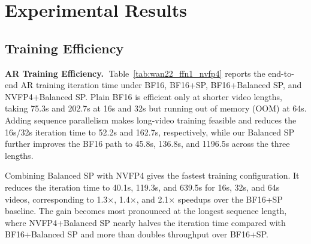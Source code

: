 \section{Experimental Results}
\subsection{Training Efficiency}
\textbf{AR Training Efficiency.}$\;$
Table~\ref{tab:wan22_ffn1_nvfp4} reports the end-to-end AR training iteration time under BF16, BF16+SP, BF16+Balanced SP, and NVFP4+Balanced SP. Plain BF16 is efficient only at shorter video lengths, taking 75.3s and 202.7s at 16s and 32s but running out of memory (OOM) at 64s. Adding sequence parallelism makes long-video training feasible and reduces the 16s/32s iteration time to 52.2s and 162.7s, respectively, while our Balanced SP further improves the BF16 path to 45.8s, 136.8s, and 1196.5s across the three lengths.

Combining Balanced SP with NVFP4 gives the fastest training configuration. It reduces the iteration time to 40.1s, 119.3s, and 639.5s for 16s, 32s, and 64s videos, corresponding to 1.3$\times$, 1.4$\times$, and 2.1$\times$ speedups over the BF16+SP baseline. The gain becomes most pronounced at the longest sequence length, where NVFP4+Balanced SP nearly halves the iteration time compared with BF16+Balanced SP and more than doubles throughput over BF16+SP. 

